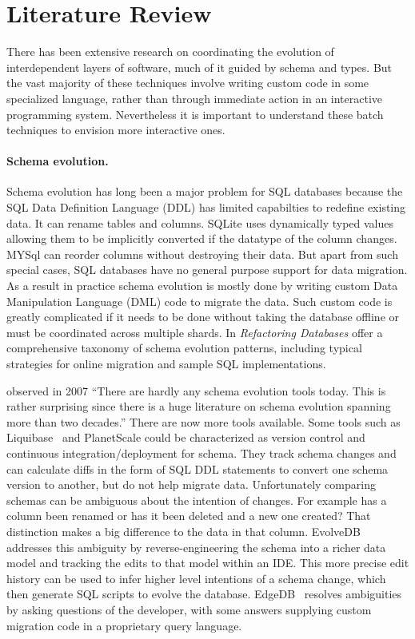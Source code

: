 \documentclass[english,submission]{programming}
\begin{document}
\newpage
\appendix

\section{Literature Review}
\label{sec:related}

There has been extensive research on coordinating the evolution of interdependent layers of software, much of it guided by schema and types. But the vast majority of these techniques involve writing custom code in some specialized language, rather than through immediate action in an interactive programming system. Nevertheless it is important to understand these batch techniques to envision more interactive ones.

\paragraph{Schema evolution.}
Schema evolution has long been a major problem for SQL databases because
the SQL Data Definition Language (DDL) has limited capabilties to redefine existing data. It can rename tables and columns. SQLite \cite{sqliteDatatypes} uses dynamically typed values allowing them to be implicitly converted if the datatype of the column changes.
MYSql \cite{mysqlAlterTable} can reorder columns without destroying their data. But apart from such special cases, SQL databases have no general purpose support for data migration. As a result in practice schema evolution is mostly done by writing custom Data Manipulation Language (DML) code to migrate the data. Such custom code is greatly complicated if it needs to be done without taking the database offline or must be coordinated across multiple shards.
In \emph{Refactoring Databases} \citet{ambler06} offer a comprehensive taxonomy of schema evolution patterns, including typical strategies for online migration and sample SQL implementations.

\citet{bernstein07} observed in 2007 ``There are hardly any schema evolution tools today. This is rather surprising since there is a huge literature on schema evolution spanning more than two decades.'' There are now more tools available. Some tools such as Liquibase~\cite{liquibase} and PlanetScale\cite{planetscale} could be characterized as version control and continuous integration/deployment for schema. They track schema changes and can calculate diffs in the form of SQL DDL statements to convert one schema version to another, but do not help migrate data. Unfortunately comparing schemas can be ambiguous about the intention of changes. For example has a column been renamed or has it been deleted and a new one created? That distinction makes a big difference to the data in that column. EvolveDB\cite{evolvedb} addresses this ambiguity by reverse-engineering the schema into a richer data model and tracking the edits to that model within an IDE. This more precise edit history can be used to infer higher level intentions of a schema change, which then generate SQL scripts to evolve the database. EdgeDB~\cite{edgedb} resolves ambiguities by asking questions of the developer, with some answers supplying custom migration code in a proprietary query language.
\end{document}
